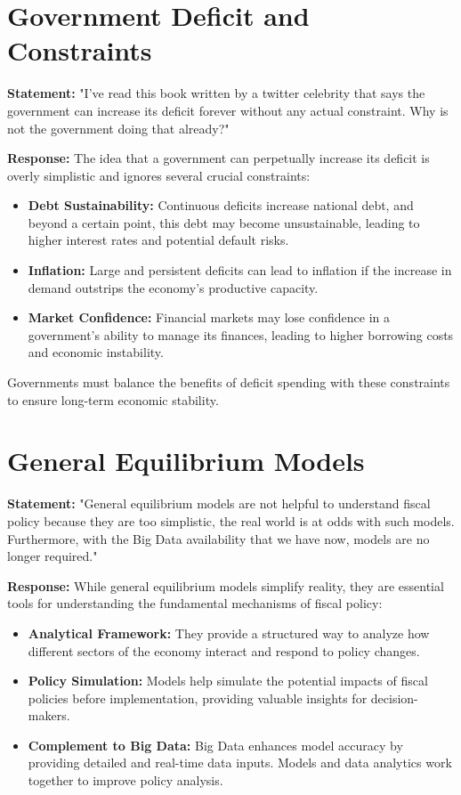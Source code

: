 \documentclass{article}
\begin{document}
\hrulefill

\section{Government Deficit and Constraints}

\textbf{Statement:} "I’ve read this book written by a twitter celebrity that says the government can increase its deficit forever without any actual constraint. Why is not the government doing that already?"

\textbf{Response:}
The idea that a government can perpetually increase its deficit is overly simplistic and ignores several crucial constraints:

\begin{itemize}
    \item \textbf{Debt Sustainability:} Continuous deficits increase national debt, and beyond a certain point, this debt may become unsustainable, leading to higher interest rates and potential default risks.
    \item \textbf{Inflation:} Large and persistent deficits can lead to inflation if the increase in demand outstrips the economy’s productive capacity.
    \item \textbf{Market Confidence:} Financial markets may lose confidence in a government's ability to manage its finances, leading to higher borrowing costs and economic instability.
\end{itemize}

Governments must balance the benefits of deficit spending with these constraints to ensure long-term economic stability.

\hrulefill

\section{General Equilibrium Models}

\textbf{Statement:} "General equilibrium models are not helpful to understand fiscal policy because they are too simplistic, the real world is at odds with such models. Furthermore, with the Big Data availability that we have now, models are no longer required."

\textbf{Response:}
While general equilibrium models simplify reality, they are essential tools for understanding the fundamental mechanisms of fiscal policy:

\begin{itemize}
    \item \textbf{Analytical Framework:} They provide a structured way to analyze how different sectors of the economy interact and respond to policy changes.
    \item \textbf{Policy Simulation:} Models help simulate the potential impacts of fiscal policies before implementation, providing valuable insights for decision-makers.
    \item \textbf{Complement to Big Data:} Big Data enhances model accuracy by providing detailed and real-time data inputs. Models and data analytics work together to improve policy analysis.
\end{itemize}
\end{document}
